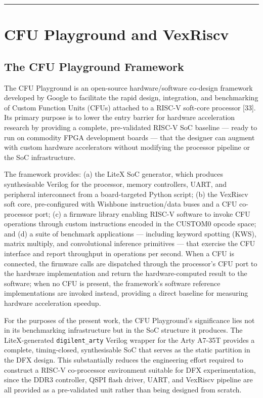 \vspace{0.4em}\hrule\vspace{0.4em}

\section{CFU Playground and VexRiscv}

\subsection{The CFU Playground Framework}

The CFU Playground is an open-source hardware/software co-design framework developed by Google to facilitate the rapid design, integration, and benchmarking of Custom Function Units (CFUs) attached to a RISC-V soft-core processor [33]. Its primary purpose is to lower the entry barrier for hardware acceleration research by providing a complete, pre-validated RISC-V SoC baseline — ready to run on commodity FPGA development boards — that the designer can augment with custom hardware accelerators without modifying the processor pipeline or the SoC infrastructure.

The framework provides: (a) the LiteX SoC generator, which produces synthesisable Verilog for the processor, memory controllers, UART, and peripheral interconnect from a board-targeted Python script; (b) the VexRiscv soft core, pre-configured with Wishbone instruction/data buses and a CFU co-processor port; (c) a firmware library enabling RISC-V software to invoke CFU operations through custom instructions encoded in the CUSTOM0 opcode space; and (d) a suite of benchmark applications — including keyword spotting (KWS), matrix multiply, and convolutional inference primitives — that exercise the CFU interface and report throughput in operations per second. When a CFU is connected, the firmware calls are dispatched through the processor's CFU port to the hardware implementation and return the hardware-computed result to the software; when no CFU is present, the framework's software reference implementations are invoked instead, providing a direct baseline for measuring hardware acceleration speedup.

For the purposes of the present work, the CFU Playground's significance lies not in its benchmarking infrastructure but in the SoC structure it produces. The LiteX-generated \texttt{digilent\_arty} Verilog wrapper for the Arty A7-35T provides a complete, timing-closed, synthesisable SoC that serves as the static partition in the DFX design. This substantially reduces the engineering effort required to construct a RISC-V co-processor environment suitable for DFX experimentation, since the DDR3 controller, QSPI flash driver, UART, and VexRiscv pipeline are all provided as a pre-validated unit rather than being designed from scratch.

